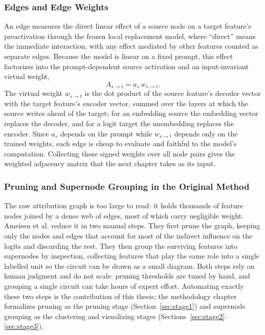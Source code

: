 \documentclass[../main.tex]{subfiles}
\begin{document}
\subsubsection{Edges and Edge Weights}
An edge measures the direct linear effect of a source node on a target feature's preactivation through the frozen local replacement model, where ``direct'' means the immediate interaction, with any effect mediated by other features counted as separate edges. Because the model is linear on a fixed prompt, this effect factorizes into the prompt-dependent source activation and an input-invariant virtual weight,
\begin{equation}
A_{s \to t} = a_s\, w_{s \to t}. \label{eq:edge-weight}
\end{equation}
The virtual weight $w_{s \to t}$ is the dot product of the source feature's decoder vector with the target feature's encoder vector, summed over the layers at which the source writes ahead of the target; for an embedding source the embedding vector replaces the decoder, and for a logit target the unembedding replaces the encoder. Since $a_s$ depends on the prompt while $w_{s \to t}$ depends only on the trained weights, each edge is cheap to evaluate and faithful to the model's computation. Collecting these signed weights over all node pairs gives the weighted adjacency matrix that the next chapter takes as its input.

\subsubsection{Pruning and Supernode Grouping in the Original Method}
The raw attribution graph is too large to read: it holds thousands of feature nodes joined by a dense web of edges, most of which carry negligible weight. Ameisen et al. reduce it in two manual steps. They first prune the graph, keeping only the nodes and edges that account for most of the indirect influence on the logits and discarding the rest. They then group the surviving features into supernodes by inspection, collecting features that play the same role into a single labelled unit so the circuit can be drawn as a small diagram. Both steps rely on human judgment and do not scale: pruning thresholds are tuned by hand, and grouping a single circuit can take hours of expert effort. Automating exactly these two steps is the contribution of this thesis; the methodology chapter formalizes pruning as the pruning stage (Section~\ref{sec:stage1}) and supernode grouping as the clustering and visualizing stages (Sections~\ref{sec:stage2}--\ref{sec:stage3}).
\end{document}
